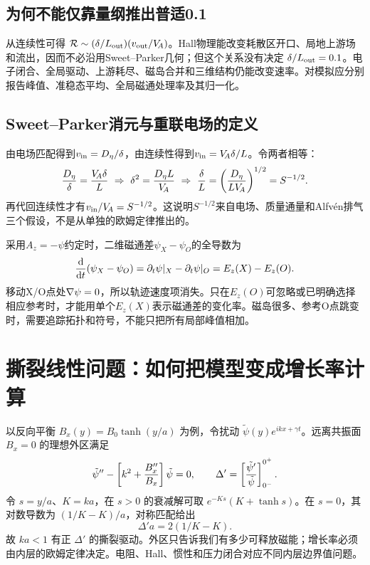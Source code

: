 \documentclass[UTF8,a4paper,11pt,openany,fontset=fandol]{ctexbook}
\begin{document}
\subsection{为何不能仅靠量纲推出普适0.1}
从连续性可得 $\mathcal R\sim(\delta/L_{\rm out})(v_{\rm out}/V_{\!A})$。Hall物理能改变耗散区开口、局地上游场和流出，因而不必沿用Sweet--Parker几何；但这个关系没有决定 $\delta/L_{\rm out}=0.1$。电子闭合、全局驱动、上游耗尽、磁岛合并和三维结构仍能改变速率。对模拟应分别报告峰值、准稳态平均、全局磁通处理率及其归一化。

\subsection{Sweet--Parker消元与重联电场的定义}
由电场匹配得到$v_{\rm in}=D_\eta/\delta$，由连续性得到$v_{\rm in}=V_{\!A}\delta/L$。令两者相等：
\begin{equation}
 {D_\eta\over\delta}={V_{\!A}\delta\over L}
 \ \Rightarrow\ \delta^2={D_\eta L\over V_{\!A}}
 \ \Rightarrow\ {\delta\over L}=\left({D_\eta\over LV_{\!A}}\right)^{1/2}
 =S^{-1/2}.
\end{equation}
再代回连续性才有$v_{\rm in}/V_{\!A}=S^{-1/2}$。这说明$S^{-1/2}$来自电场、质量通量和Alfvén排气三个假设，不是从单独的欧姆定律推出的。

采用$A_z=-\psi$约定时，二维磁通差$\psi_X-\psi_O$的全导数为
\begin{equation}
 {\mathrm d\over\mathrm dt}(\psi_X-\psi_O)
 =\partial_t\psi|_X-\partial_t\psi|_O=E_z(X)-E_z(O).
\end{equation}
移动X/O点处$\nabla\psi=0$，所以轨迹速度项消失。只在$E_z(O)$可忽略或已明确选择相应参考时，才能用单个$E_z(X)$表示磁通差的变化率。磁岛很多、参考O点跳变时，需要追踪拓扑和符号，不能只把所有局部峰值相加。



\section{撕裂线性问题：如何把模型变成增长率计算}
以反向平衡 $B_x(y)=B_0\tanh(y/a)$ 为例，令扰动 $\tilde\psi(y)e^{ikx+\gamma t}$。远离共振面 $B_x=0$ 的理想外区满足
\begin{equation}\tilde\psi''-\left[k^2+{B_x''\over B_x}\right]\tilde\psi=0,\qquad
\Delta'=\left[{\tilde\psi'\over\tilde\psi}\right]_{0^-}^{0^+}.
\end{equation}
令 $s=y/a$、$K=ka$，在 $s>0$ 的衰减解可取 $e^{-Ks}(K+\tanh s)$。在 $s=0$，其对数导数为 $(1/K-K)/a$，对称匹配给出
\begin{equation}\Delta'a=2(1/K-K).
\end{equation}
故 $ka<1$ 有正 $\Delta'$ 的撕裂驱动。外区只告诉我们有多少可释放磁能；增长率必须由内层的欧姆定律决定。电阻、Hall、惯性和压力闭合对应不同内层边界值问题。
\end{document}
